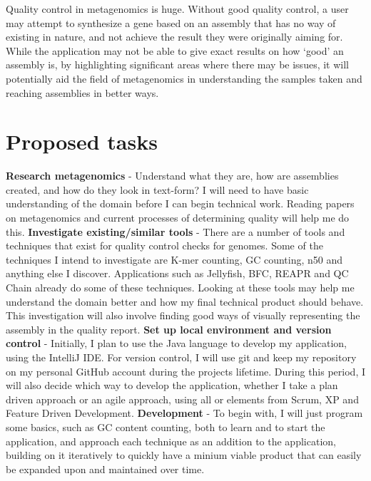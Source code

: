 \documentclass[11pt,fleqn,twoside]{article}
\begin{document}
Quality control in metagenomics is huge. Without good quality control, a user may attempt to synthesize a gene based on an assembly that has no way of existing in nature, and not achieve the result they were originally aiming for. While the application may not be able to give exact results on how `good' an assembly is, by highlighting significant areas where there may be issues, it will potentially aid the field of metagenomics in understanding the samples taken and reaching assemblies in better ways.

\section{Proposed tasks}
\textbf{Research metagenomics} - Understand what they are, how are assemblies created, and how do they look in text-form? I will need to have basic understanding of the domain before I can begin technical work. Reading papers on metagenomics and current processes of determining quality will help me do this.
\newline
\noindent
\textbf{Investigate existing/similar tools} - There are a number of tools and techniques that exist for quality control checks for genomes. Some of the techniques I intend to investigate are K-mer\cite{kmer} counting, GC counting\cite{gccount}, n50 and anything else I discover. Applications such as Jellyfish\cite{jellyfish}, BFC\cite{bfc}, REAPR\cite{reapr} and QC Chain\cite{qcchain} already do some of these techniques. Looking at these tools may help me understand the domain better and how my final technical product should behave. This investigation will also involve finding good ways of visually representing the assembly in the quality report.
\newline
\noindent
\textbf{Set up local environment and version control} - Initially, I plan to use the Java language to develop my application, using the IntelliJ IDE. For version control, I will use git and keep my repository on my personal GitHub account during the projects lifetime. During this period, I will also decide which way to develop the application, whether I take a plan driven approach or an agile approach, using all or elements from Scrum, XP and Feature Driven Development.
\newline
\noindent
\textbf{Development} - To begin with, I will just program some basics, such as GC content counting, both to learn and to start the application, and approach each technique as an addition to the application, building on it iteratively to quickly have a minium viable product that can easily be expanded upon and maintained over time. 
\end{document}
